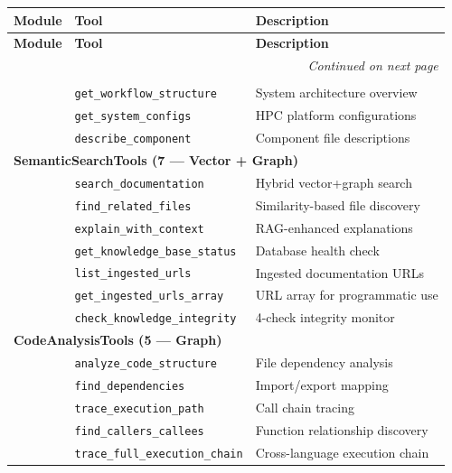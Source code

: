 \documentclass[11pt,letterpaper]{article}
\begin{document}
\begin{longtable}{@{}llp{5.5cm}@{}}
\toprule
\textbf{Module} & \textbf{Tool} & \textbf{Description} \\
\midrule
\endfirsthead
\toprule
\textbf{Module} & \textbf{Tool} & \textbf{Description} \\
\midrule
\endhead
\midrule
\multicolumn{3}{r}{\textit{Continued on next page}} \\
\bottomrule
\endfoot
\bottomrule
\endlastfoot

\multicolumn{3}{l}{\textbf{WorkflowInfoTools (3 --- Static)}} \\
& \texttt{get\_workflow\_structure} & System architecture overview \\
& \texttt{get\_system\_configs} & HPC platform configurations \\
& \texttt{describe\_component} & Component file descriptions \\
\midrule

\multicolumn{3}{l}{\textbf{SemanticSearchTools (7 --- Vector + Graph)}} \\
& \texttt{search\_documentation} & Hybrid vector+graph search \\
& \texttt{find\_related\_files} & Similarity-based file discovery \\
& \texttt{explain\_with\_context} & RAG-enhanced explanations \\
& \texttt{get\_knowledge\_base\_status} & Database health check \\
& \texttt{list\_ingested\_urls} & Ingested documentation URLs \\
& \texttt{get\_ingested\_urls\_array} & URL array for programmatic use \\
& \texttt{check\_knowledge\_integrity} & 4-check integrity monitor \\
\midrule

\multicolumn{3}{l}{\textbf{CodeAnalysisTools (5 --- Graph)}} \\
& \texttt{analyze\_code\_structure} & File dependency analysis \\
& \texttt{find\_dependencies} & Import/export mapping \\
& \texttt{trace\_execution\_path} & Call chain tracing \\
& \texttt{find\_callers\_callees} & Function relationship discovery \\
& \texttt{trace\_full\_execution\_chain} & Cross-language execution chain \\
\midrule


\end{longtable}
\end{document}

